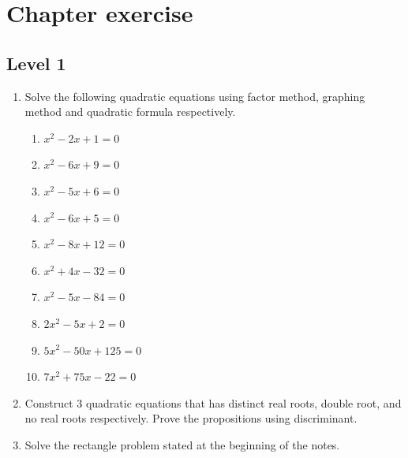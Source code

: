 \documentclass[12pt]{article}
\begin{document}
    \section*{Chapter exercise}
    \subsection*{Level 1}
    \begin{enumerate}
        \item Solve the following quadratic equations using factor method, graphing method and quadratic formula respectively.\begin{enumerate}
            \item $x^2-2x+1=0$
            \item $x^2-6x+9=0$
            \item $x^2-5x+6=0$
            \item $x^2-6x+5=0$
            \item $x^2-8x+12=0$
            \item $x^2+4x-32=0$
            \item $x^2-5x-84=0$
            \item $2x^2-5x+2=0$
            \item $5x^2-50x+125=0$
            \item $7x^2+75x-22=0$
        \end{enumerate}
        \item Construct 3 quadratic equations that has distinct real roots, double root, and no real roots respectively. Prove the propositions using discriminant.
        \item Solve the rectangle problem stated at the beginning of the notes.
    \end{enumerate}
\end{document}
